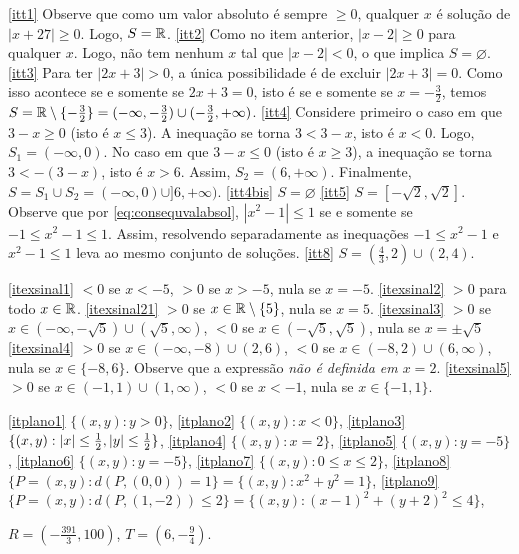 \begin{Solution}{1.9}
\eqref{itt1} Observe que como um valor absoluto é sempre $\geq 0$,
qualquer $x$ é solução de $|x+27|\geq 0$. Logo, $S=\mathbb{R}$. \eqref{itt2} Como no
item anterior, $|x-2|\geq 0$ para qualquer $x$. Logo, não tem nenhum $x$ tal que
$|x-2|<0$, o que implica $S=\varnothing$. \eqref{itt3} Para ter $|2x+3|>0$, a
única possibilidade é de excluir $|2x+3|=0$. Como isso acontece se e somente se
$2x+3=0$, isto é se e somente se $x=-\tfrac32$, temos $S=\mathbb{R}\setminus
\{-\tfrac32\}=(-\infty,-\tfrac32)\cup(-\tfrac32,+\infty)$.
\eqref{itt4} Considere primeiro o caso em que $3-x\geq 0$ (isto é $x\leq 3$). A inequação
se torna $3<3-x$, isto é $x<0$. Logo, $S_1=(-\infty,0)$. No caso em que $3-x\leq 0$ (isto
é $x\geq 3$), a inequação se torna $3<-(3-x)$, isto é $x>6$. Assim, $S_2=(6,+\infty)$.
Finalmente, $S=S_1\cup S_2=(-\infty,0)\cup ]6,+\infty)$.
\eqref{itt4bis} $S=\varnothing$
\eqref{itt5} $S=[-\sqrt{2},\sqrt{2}]$. Observe que por
\eqref{eq:consequvalabsol}, $|x^2-1|\leq 1$ se e somente se
$-1\leq x^2-1\leq 1$. Assim, resolvendo separadamente as inequações $-1\leq x^2-1$ e
$x^2-1\leq 1$ leva ao mesmo conjunto de soluções.
\eqref{itt8} $S=(\tfrac43,2)\cup (2,4)$.
\end{Solution}
\begin{Solution}{1.10}
\eqref{itexsinal1} $<0$ se $x<-5$, $>0$ se $x>-5$, nula se $x=-5$.
\eqref{itexsinal2} $>0$ para todo $x\in \mathbb{R}$.
\eqref{itexsinal21} $>0$ se $x\in\mathbb{R}\setminus \{5\}$, nula se $x=5$.
\eqref{itexsinal3} $>0$ se $x\in (-\infty,-\sqrt{5})\cup (\sqrt{5},\infty)$, $<0$ se
$x\in (-\sqrt{5},\sqrt{5})$, nula se $x=\pm \sqrt{5}$
\eqref{itexsinal4} $>0$ se $x\in (-\infty,-8)\cup (2,6)$, $<0$ se $x\in (-8,2)\cup
(6,\infty)$, nula se $x\in \{-8,6\}$. Observe que a expressão \emph{não é definida em
$x=2$}.
\eqref{itexsinal5} $>0$ se $x\in (-1,1)\cup(1,\infty)$, $<0$ se $x<-1$, nula se $x\in
\{-1,1\}$.
\end{Solution}
\begin{Solution}{1.11}
\eqref{itplano1} $\{(x,y):y> 0\}$,
\eqref{itplano2} $\{(x,y):x< 0\}$,
\eqref{itplano3} $\{(x,y):|x|\leq \frac{1}{2}, |y|\leq \frac{1}{2}\}$,
\eqref{itplano4} $\{(x,y): x=2\}$,
\eqref{itplano5} $\{(x,y): y=-5\}$,
\eqref{itplano6} $\{(x,y): y=-5\}$,
\eqref{itplano7} $\{(x,y): 0\leq x\leq 2\}$,
\eqref{itplano8} $\{P=(x,y): d(P,(0,0))=1\}=\{(x,y):x^2+y^2=1\}$,
\eqref{itplano9} $\{P=(x,y): d(P,(1,-2))\leq 2\}=\{(x,y):(x-1)^2+(y+2)^2\leq 4\}$,
\end{Solution}
\begin{Solution}{1.12}
$R=(-\frac{391}{3},100)$, $T=(6,-\frac{9}{4})$.
\end{Solution}
